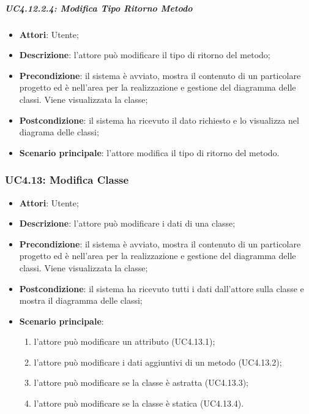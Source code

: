 \subparagraph{UC4.12.2.4: Modifica Tipo Ritorno Metodo}
\label{UC4.12.2.4}
\begin{itemize}
	\item \textbf{Attori}: Utente;
	\item \textbf{Descrizione}: l'attore può modificare il tipo di ritorno del metodo;
	\item \textbf{Precondizione}: il sistema è avviato, mostra il contenuto di un particolare progetto ed è nell'area per la realizzazione e gestione del diagramma delle classi. Viene visualizzata la classe;
	\item \textbf{Postcondizione}: il sistema ha ricevuto il dato richiesto e lo visualizza nel diagrama delle classi;
	\item \textbf{Scenario principale}: l'attore modifica il tipo di ritorno del metodo.
\end{itemize}

\subsubsection{UC4.13: Modifica Classe}
\label{UC4.13}
\begin{itemize}
	\item \textbf{Attori}: Utente;
	\item \textbf{Descrizione}: l'attore può modificare i dati di una classe;
	\item \textbf{Precondizione}: il sistema è avviato, mostra il contenuto di un particolare progetto ed è nell'area per la realizzazione e gestione del diagramma delle classi. Viene visualizzata la classe;
	\item \textbf{Postcondizione}: il sistema ha ricevuto tutti i dati dall'attore sulla classe e mostra il diagramma delle classi;
	\item \textbf{Scenario principale}:
	\begin{enumerate}
		\item l'attore può modificare un attributo (UC4.13.1);
		\item l'attore può modificare i dati aggiuntivi di un metodo (UC4.13.2);
		\item l'attore può modificare se la classe è astratta (UC4.13.3);
		\item l'attore può modificare se la classe è statica (UC4.13.4).
	\end{enumerate}
\end{itemize}

